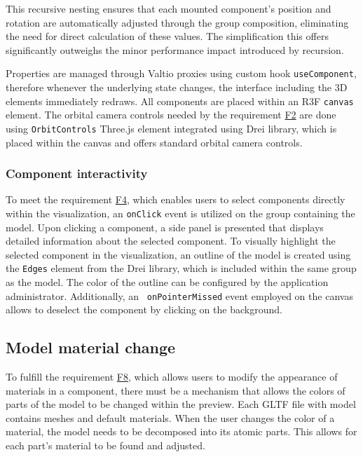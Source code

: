 This recursive nesting ensures that each mounted component's position and rotation are automatically adjusted through the group composition, eliminating the need for direct calculation of these values. The simplification this offers significantly outweighs the minor performance impact introduced by recursion.

Properties are managed through Valtio proxies using custom hook \texttt{useComponent}, therefore whenever the underlying state changes, the interface including the 3D elements immediately redraws.
All components are placed within an R3F \texttt{canvas} element. The orbital camera controls needed by the requirement \hyperref[itm:F2]{F2} are done using \texttt{OrbitControls} Three.js element integrated using Drei library, which is placed within the canvas and offers standard orbital camera controls.

\subsubsection{Component interactivity}

To meet the requirement \hyperref[itm:F4]{F4}, which enables users to select components directly within the visualization, an \texttt{onClick} event is utilized on the group containing the model. Upon clicking a component, a side panel is presented that displays detailed information about the selected component. To visually highlight the selected component in the visualization, an outline of the model is created using the \texttt{Edges} element from the Drei library, which is included within the same group as the model. The color of the outline can be configured by the application administrator. Additionally, an \texttt{ onPointerMissed} event employed on the canvas allows to deselect the component by clicking on the background.

\subsection{Model material change}

To fulfill the requirement \hyperref[itm:F8]{F8}, which allows users to modify the appearance of materials in a component, there must be a mechanism that allows the colors of parts of the model to be changed within the preview. Each GLTF file with model contains meshes and default materials. When the user changes the color of a material, the model needs to be decomposed into its atomic parts. This allows for each part's material to be found and adjusted. 

